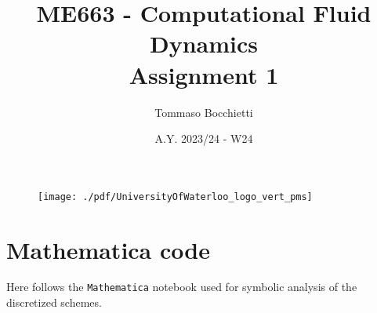 \documentclass{assignment}
\begin{document}
\graphicspath{{./img/}}


\title{ME663 - Computational Fluid Dynamics \\ Assignment 1}
\author{Tommaso Bocchietti}
\date{A.Y. 2023/24 - W24}

\maketitle

\begin{figure}[H]
    \centering
    \texttt{[image: ./pdf/UniversityOfWaterloo\_logo\_vert\_pms]}
    \label{fig:University_Of_Waterloo_logo}
\end{figure}

\clearpage
\tableofcontents
\listoffigures
\listoftables
\lstlistoflistings
\printglossary[type=\acronymtype]

\clearpage








\clearpage



\clearpage
\appendix
\section{Mathematica code}
\label{sec:appendix}

Here follows the \texttt{Mathematica} notebook used for symbolic analysis of the discretized schemes.


\end{document}
